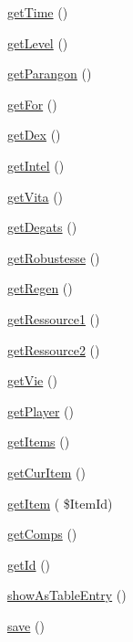 \begin{DoxyCompactItemize}
\item 
\hyperlink{class_hero_af13ab8207e0342d40d20aee7e9dc1b94}{get\+Time} ()
\item 
\hyperlink{class_hero_ac2c4274358ea9c0d0909e7e95bf7a1c2}{get\+Level} ()
\item 
\hyperlink{class_hero_a6724c7043a69e5abb19c8f42df5bd4a1}{get\+Parangon} ()
\item 
\hyperlink{class_hero_a04d0cabdc6cc33bbfa93476eee37af4e}{get\+For} ()
\item 
\hyperlink{class_hero_a1af6036f21efc21389f54721f88819da}{get\+Dex} ()
\item 
\hyperlink{class_hero_aded0e048a90f381fbe01ce8a6227c6a3}{get\+Intel} ()
\item 
\hyperlink{class_hero_a8ad56bd0376afaf55d98d68cd24f6f29}{get\+Vita} ()
\item 
\hyperlink{class_hero_ab432f72a5bfae4106b1d12db5db042c5}{get\+Degats} ()
\item 
\hyperlink{class_hero_ac31ad2df259f5decaaa4cb7a8b4b22ad}{get\+Robustesse} ()
\item 
\hyperlink{class_hero_af53e2ac1b681edd8aa5df9e7ff3ded9f}{get\+Regen} ()
\item 
\hyperlink{class_hero_a245366660d4e206f98b4e013236d1ff0}{get\+Ressource1} ()
\item 
\hyperlink{class_hero_a1a51d9f394b7a921fda8a2c235a6daa7}{get\+Ressource2} ()
\item 
\hyperlink{class_hero_a8dbad04d3df0c4451fd0eca90c795e2e}{get\+Vie} ()
\item 
\hyperlink{class_hero_a4d4e2d1cbefca5ae1445a495cbba43c2}{get\+Player} ()
\item 
\hyperlink{class_hero_a461a3bd345dfcc026603d83d1e48a0f6}{get\+Items} ()
\item 
\hyperlink{class_hero_a3a76dca85e9913045d3f197e05b39d2c}{get\+Cur\+Item} ()
\item 
\hyperlink{class_hero_ac307892e8fbd47335279e60ca2725692}{get\+Item} ( \$Item\+Id)
\item 
\hyperlink{class_hero_a5ca87b00dc40de9c61642c293f8f739a}{get\+Comps} ()
\item 
\hyperlink{class_hero_a395e2c32870dc757c39837615368aaa5}{get\+Id} ()
\item 
\hyperlink{class_hero_addb871db0a6ad4af6209a9d6b155ab79}{show\+As\+Table\+Entry} ()
\item 
\hyperlink{class_hero_af901d5ac2e1b888eacef95d42f07a4d8}{save} ()
\end{DoxyCompactItemize}
